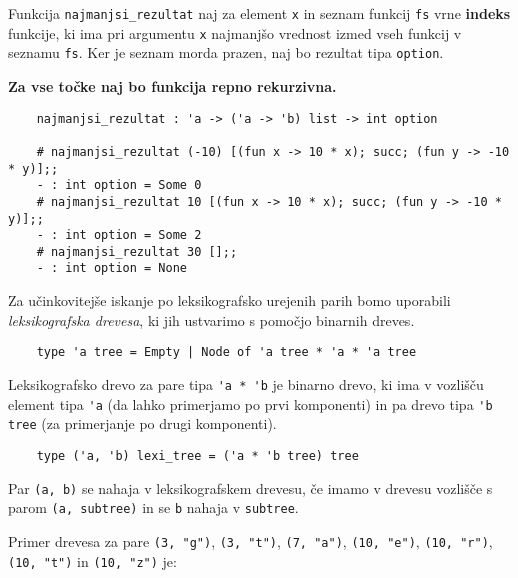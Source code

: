 \documentclass[arhiv]{../izpit}
\begin{document}
\podnaloga[\tocke{7}]
Funkcija \verb|najmanjsi_rezultat| naj za element \verb|x| in seznam funkcij \verb|fs| vrne \textbf{indeks} funkcije, ki ima pri argumentu \verb|x| najmanjšo vrednost izmed vseh funkcij v seznamu \verb|fs|. Ker je seznam morda prazen, naj bo rezultat tipa \verb|option|.

\textbf{Za vse točke naj bo funkcija repno rekurzivna.}

{\small\begin{verbatim}
    najmanjsi_rezultat : 'a -> ('a -> 'b) list -> int option

    # najmanjsi_rezultat (-10) [(fun x -> 10 * x); succ; (fun y -> -10 * y)];;  
    - : int option = Some 0
    # najmanjsi_rezultat 10 [(fun x -> 10 * x); succ; (fun y -> -10 * y)];;    
    - : int option = Some 2
    # najmanjsi_rezultat 30 [];;
    - : int option = None
\end{verbatim}}


\naloga[\tocke{30}]

Za učinkovitejše iskanje po leksikografsko urejenih parih bomo uporabili \emph{leksikografska drevesa}, ki jih ustvarimo s pomočjo binarnih dreves.

\begin{verbatim}
    type 'a tree = Empty | Node of 'a tree * 'a * 'a tree
\end{verbatim}

Leksikografsko drevo za pare tipa \verb|'a * 'b| je binarno drevo, ki ima v
vozlišču element tipa \verb|'a| (da lahko primerjamo po prvi komponenti) in pa drevo tipa \verb|'b tree| (za primerjanje po drugi komponenti).

\begin{verbatim}
    type ('a, 'b) lexi_tree = ('a * 'b tree) tree
\end{verbatim}

Par \verb|(a, b)| se nahaja v leksikografskem drevesu, če imamo v drevesu vozlišče s parom \verb|(a, subtree)| in se \verb|b| nahaja v \verb|subtree|.

Primer drevesa za pare \verb|(3, "g")|, \verb|(3, "t")|, \verb|(7, "a")|, \verb|(10, "e")|, \verb|(10, "r")|, \verb|(10, "t")| in \verb|(10, "z")| je:
\end{document}

